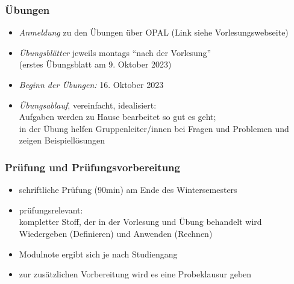 \documentclass[aspectratio=1610,onlymath]{beamer}
\begin{document}
\begin{frame}\frametitle{Übungen}
\begin{itemize}
\item \emph{Anmeldung} zu den Übungen über OPAL (Link siehe Vorlesungswebseite)
\item \emph{Übungsblätter} jeweils montags ``nach der Vorlesung''\\
	(erstes Übungsblatt am 9. Oktober 2023)
\item \emph{Beginn der Übungen:} 16. Oktober 2023
\item \emph{Übungsablauf}, vereinfacht, idealisiert:\\
	Aufgaben werden zu Hause bearbeitet so gut es geht;\\
	in der Übung helfen Gruppenleiter/innen bei Fragen und Problemen und zeigen Beispiellösungen\\[1ex]
\end{itemize}

\end{frame}


\begin{frame}\frametitle{Prüfung und Prüfungsvorbereitung}
\begin{itemize}
\item schriftliche Prüfung (90min) am Ende des Wintersemesters
\item prüfungsrelevant:\\
	kompletter Stoff, der in der Vorlesung und Übung behandelt wird\\
	Wiedergeben (Definieren) \alert{und} Anwenden (Rechnen)
\item Modulnote ergibt sich je nach Studiengang
\item zur zusätzlichen Vorbereitung wird es eine Probeklausur geben
\end{itemize}

\end{frame}
\end{document}
